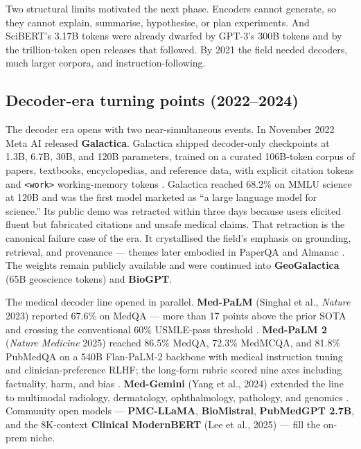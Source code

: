 \documentclass{article}
\begin{document}
Two structural limits motivated the next phase. Encoders cannot generate, so they cannot explain, summarise, hypothesise, or plan experiments. And SciBERT's 3.17B tokens were already dwarfed by GPT-3's 300B tokens and by the trillion-token open releases that followed. By 2021 the field needed decoders, much larger corpora, and instruction-following.

\subsection{Decoder-era turning points (2022--2024)}\label{decoder-era-turning-points-20222024}

The decoder era opens with two near-simultaneous events. In November 2022 Meta AI released \textbf{Galactica}. Galactica shipped decoder-only checkpoints at 1.3B, 6.7B, 30B, and 120B parameters, trained on a curated 106B-token corpus of papers, textbooks, encyclopedias, and reference data, with explicit citation tokens and \texttt{\textless{}work\textgreater{}} working-memory tokens \cite{taylor2022arxiv2211090852022}. Galactica reached 68.2\% on MMLU science at 120B and was the first model marketed as ``a large language model for science.'' Its public demo was retracted within three days because users elicited fluent but fabricated citations and unsafe medical claims. That retraction is the canonical failure case of the era. It crystallised the field's emphasis on grounding, retrieval, and provenance --- themes later embodied in PaperQA \cite{ala2023arxiv2312075592023} and Almanac \cite{zakka2024almanacretrievalau}. The weights remain publicly available and were continued into \textbf{GeoGalactica} (65B geoscience tokens) \cite{lin2023geogalacticaascien} and \textbf{BioGPT}.

The medical decoder line opened in parallel. \textbf{Med-PaLM} (Singhal et al., \emph{Nature} 2023) reported 67.6\% on MedQA --- more than 17 points above the prior SOTA and crossing the conventional 60\% USMLE-pass threshold \cite{singhal2023largelanguagemodel}. \textbf{Med-PaLM 2} (\emph{Nature Medicine} 2025) reached 86.5\% MedQA, 72.3\% MedMCQA, and 81.8\% PubMedQA on a 540B Flan-PaLM-2 backbone with medical instruction tuning and clinician-preference RLHF; the long-form rubric scored nine axes including factuality, harm, and bias \cite{singhal2025towardexpertlevelm}. \textbf{Med-Gemini} (Yang et al., 2024) extended the line to multimodal radiology, dermatology, ophthalmology, pathology, and genomics \cite{yang2024advancingmultimoda}. Community open models --- \textbf{PMC-LLaMA}, \textbf{BioMistral}, \textbf{PubMedGPT 2.7B}, and the 8K-context \textbf{Clinical ModernBERT} (Lee et al., 2025) \cite{lee2025arxiv2504039642025} --- fill the on-prem niche.
\end{document}
